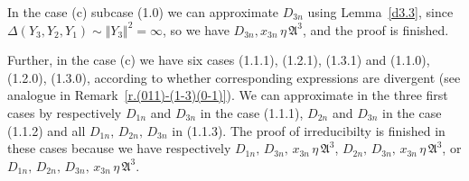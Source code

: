 \documentclass[preprint,12pt]{elsarticle}
\numberwithin{equation}{section}
\begin{document}
In the case (c) subcase (1.0)  we can approximate $D_{3n}$ using 
Lemma~\ref{d3.3}, since 
$\Delta(Y_3,Y_2,Y_1)\sim \Vert Y_3\Vert^2=\infty$, 
so we have $D_{3n},x_{3n}\,\eta\, {\mathfrak A}^3$,
and the proof is finished.

%
Further, in the case (c) we have six cases (1.1.1), (1.2.1), (1.3.1) and  
(1.1.0), (1.2.0), (1.3.0), 
according to whether %
corresponding expressions are divergent
(see analogue in Remark~\ref{r.(011)-(1-3)(0-1)}).
%
We can approximate in the three first cases by respectively
% 
$D_{1n}$ and $ D_{3n}$ in 
the case (1.1.1),
$D_{2n}$ and $D_{3n}$ in
the case (1.1.2)
and all $D_{1n},\,D_{2n},\,D_{3n}$ in (1.1.3).
The proof of irreducibilty is finished in these cases
because we have respectively 
$D_{1n},\,D_{3n},\,x_{3n}\,\eta\,{\mathfrak A}^3$,
$D_{2n},\,D_{3n},\,x_{3n}\,\eta\,{\mathfrak A}^3$,
or $D_{1n},\,D_{2n},\,D_{3n},\,x_{3n}\,\eta\, {\mathfrak A}^3$.
\end{document}
